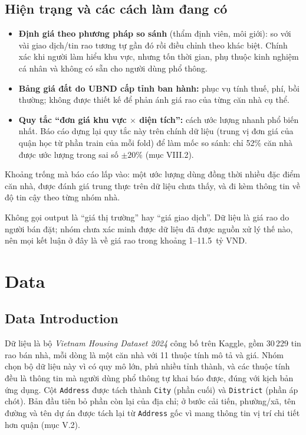 \documentclass[11pt]{article}
\newcommand{\ty}{tỷ VND}
\begin{document}
\subsection{Hiện trạng và các cách làm đang có}

\begin{itemize}
    \item \textbf{Định giá theo phương pháp so sánh} (thẩm định viên, môi giới): so với vài giao dịch/tin
          rao tương tự gần đó rồi điều chỉnh theo khác biệt. Chính xác khi người làm hiểu khu vực, nhưng
          tốn thời gian, phụ thuộc kinh nghiệm cá nhân và không có sẵn cho người dùng phổ thông.
    \item \textbf{Bảng giá đất do UBND cấp tỉnh ban hành:} phục vụ tính thuế, phí, bồi thường; không được
          thiết kế để phản ánh giá rao của từng căn nhà cụ thể.
    \item \textbf{Quy tắc ``đơn giá khu vực $\times$ diện tích'':} cách ước lượng nhanh phổ biến nhất. Báo
          cáo dựng lại quy tắc này trên chính dữ liệu (trung vị đơn giá của quận học từ phần train của
          mỗi fold) để làm mốc so sánh: chỉ 52\% căn nhà được ước lượng trong sai số $\pm 20\%$ (mục VIII.2).
\end{itemize}

Khoảng trống mà báo cáo lấp vào: một ước lượng dùng đồng thời nhiều đặc điểm căn nhà, được đánh giá
trung thực trên dữ liệu chưa thấy, và đi kèm thông tin về độ tin cậy theo từng nhóm nhà.

\begin{warnbox}
Không gọi output là ``giá thị trường'' hay ``giá giao dịch''. Dữ liệu là giá rao do người bán đặt; nhóm
chưa xác minh được dữ liệu đã được nguồn xử lý thế nào, nên mọi kết luận ở đây là về giá rao trong khoảng
1--11.5~\ty.
\end{warnbox}

\section{Data}

\subsection{Data Introduction}

Dữ liệu là bộ \textit{Vietnam Housing Dataset 2024} công bố trên Kaggle, gồm 30\,229 tin rao bán nhà,
mỗi dòng là một căn nhà với 11 thuộc tính mô tả và giá. Nhóm chọn bộ dữ liệu này vì có quy mô lớn, phủ
nhiều tỉnh thành, và các thuộc tính đều là thông tin mà người dùng phổ thông tự khai báo được, đúng với
kịch bản ứng dụng. Cột \texttt{Address} được tách thành \texttt{City} (phần cuối) và \texttt{District}
(phần áp chót). Bản đầu tiên bỏ phần còn lại của địa chỉ; ở bước cải tiến, phường/xã, tên đường và tên dự án
được tách lại từ \texttt{Address} gốc vì mang thông tin vị trí chi tiết hơn quận (mục V.2).
\end{document}
